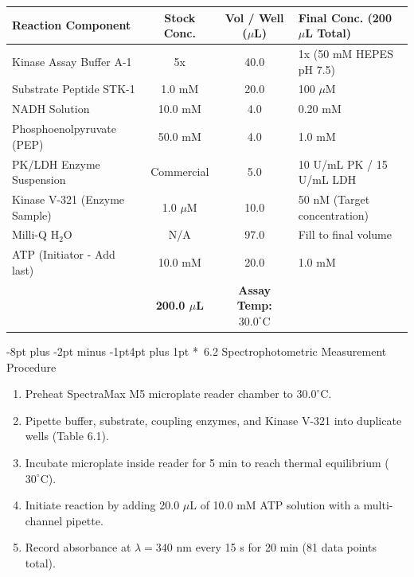 \documentclass[10pt,a4paper]{article}
\makeatletter
\renewcommand\subsection{\@startsection{subsection}{2}{\z@}%
  {-8pt plus -2pt minus -1pt}{4pt plus 1pt}%
  {\normalfont\small\bfseries\color{SopTeal}}}
\makeatother
\begin{document}
\begin{table}[h!]
  \centering
  \scriptsize
  \renewcommand{\arraystretch}{1.15}
  \begin{tabularx}{\textwidth}{|Y|c|c|Y|}
    \hline
    \color{white}\textbf{Reaction Component} & \color{white}\textbf{Stock Conc.} & \color{white}\textbf{Vol / Well ($\mu$L)} & \color{white}\textbf{Final Conc. (200 $\mu$L Total)} \\ \hline
    Kinase Assay Buffer A-1 & 5x & 40.0 & 1x (50 mM HEPES pH 7.5) \\ \hline
    Substrate Peptide STK-1 & 1.0 mM & 20.0 & 100 $\mu$M \\ \hline
    NADH Solution & 10.0 mM & 4.0 & 0.20 mM \\ \hline
    Phosphoenolpyruvate (PEP) & 50.0 mM & 4.0 & 1.0 mM \\ \hline
    PK/LDH Enzyme Suspension & Commercial & 5.0 & 10 U/mL PK / 15 U/mL LDH \\ \hline
    Kinase V-321 (Enzyme Sample) & 1.0 $\mu$M & 10.0 & 50 nM (Target concentration) \\ \hline
    Milli-Q $\text{H}_2\text{O}$ & N/A & 97.0 & Fill to final volume \\ \hline
    ATP (Initiator - Add last) & 10.0 mM & 20.0 & 1.0 mM \\ \hline
     & \color{white}\textbf{200.0 $\mu$L} & \color{white}\textbf{Assay Temp: $30.0^\circ\text{C}$} \\ \hline
  \end{tabularx}
\end{table}

\subsection*{\faPlayCircle\ 6.2 Spectrophotometric Measurement Procedure}
\begin{enumerate}
  \item Preheat SpectraMax M5 microplate reader chamber to $30.0^\circ\text{C}$.
  \item Pipette buffer, substrate, coupling enzymes, and Kinase V-321 into duplicate wells (Table 6.1).
  \item Incubate microplate inside reader for 5 min to reach thermal equilibrium ($30^\circ\text{C}$).
  \item Initiate reaction by adding 20.0 $\mu$L of 10.0 mM ATP solution with a multi-channel pipette.
  \item Record absorbance at $\lambda = 340\text{ nm}$ every 15 s for 20 min (81 data points total).
\end{enumerate}
\end{document}
